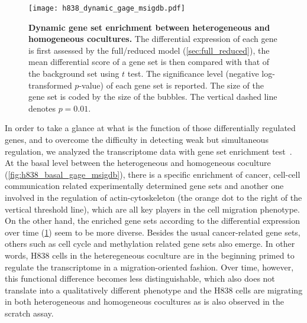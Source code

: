 \begin{figure}[!ht]
\begin{center}
\texttt{[image: h838\_dynamic\_gage\_msigdb.pdf]}
\end{center}
\caption[Dynamic gene set enrichment]{
{\bf Dynamic gene set enrichment between heterogeneous and homogeneous 
cocultures.} 
The differential expression of each gene is first assessed by the full/reduced
model (\ref{sec:full_reduced}), the mean differential score of a gene set
is then compared with that of the background set using $t$ test.
The significance level (negative log-transformed $p$-value) of
each gene set is reported. The size
of the gene set is coded by the size of the bubbles.
The vertical dashed line denotes $p=0.01$.
}
\label{fig:h838_dynamic_gage_msigdb}
\end{figure}

In order to take a glance at what is the function of those
differentially regulated genes, and to overcome the difficulty in detecting weak
but simultaneous regulation, we analyzed the transcriptome data with gene set
enrichment test~\citep{Luo2009}.
At the basal level between the heterogeneous and homogeneous
coculture
(\ref{fig:h838_basal_gage_msigdb}),
there is a specific enrichment of cancer, 
cell-cell communication
related experimentally determined gene sets and another one 
involved in the regulation
of actin-cytoskeleton (the orange dot to the right of the 
vertical threshold line), which are all key players in the
cell migration phenotype.
On the other hand, the enriched gene sets
according to the differential expression over time 
(\ref{fig:h838_dynamic_gage_msigdb})
seem to be more diverse. Besides the usual cancer-related 
gene sets, others such as cell cycle and methylation related
gene sets also emerge.
In other words, H838 cells in the heteregeneous coculture
are in the beginning primed to regulate the transcriptome in
a migration-oriented fashion.
Over time, however, this functional difference becomes less
distinguishable,
which also does not translate into a qualitatively different 
phenotype and the H838 cells are migrating 
in both heterogeneous and
homogeneous cocultures 
as is also observed in the scratch assay.

